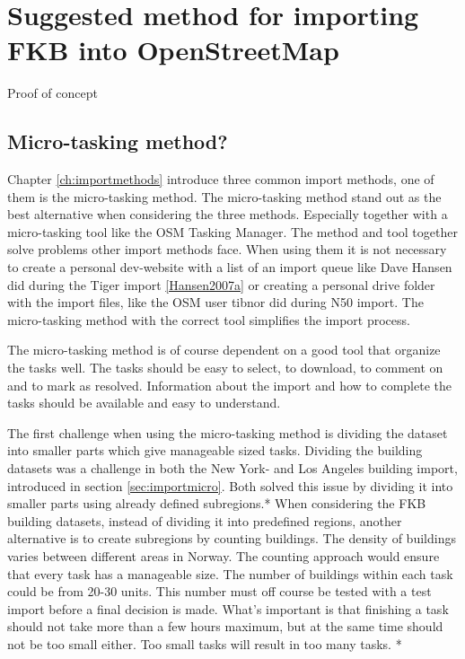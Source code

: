 \chapter{Suggested method for importing FKB into OpenStreetMap}\label{ch:suggmethod}
Proof of concept 

\section{Micro-tasking method?}
Chapter \ref{ch:importmethods} introduce three common import methods, one of them is the micro-tasking method. The micro-tasking method stand out as the best alternative when considering the three methods. Especially together with a micro-tasking tool like the OSM Tasking Manager. The method and tool together solve problems other import methods face. When using them it is not necessary to create a personal dev-website with a list of an import queue like Dave Hansen did during the Tiger import \ref{Hansen2007a} or creating a personal drive folder with the import files, like the OSM user tibnor did during N50 import. The micro-tasking method with the correct tool simplifies the import process.  

The micro-tasking method is of course dependent on a good tool that organize the tasks well. The tasks should be easy to select, to download, to comment on and to mark as resolved. Information about the import and how to complete the tasks should be available and easy to understand. 

The first challenge when using the micro-tasking method is dividing the dataset into smaller parts which give manageable sized tasks. Dividing the building datasets was a challenge in both the New York- and Los Angeles building import, introduced in section \ref{sec:importmicro}. Both solved this issue by dividing it into smaller parts using already defined subregions.*%
 When considering the FKB building datasets, instead of dividing it into predefined regions, another alternative is to create subregions by counting buildings. The density of buildings varies between different areas in Norway. %
 The counting approach would ensure that every task has a manageable size. The number of buildings within each task could be from 20-30 units. This number must off course be tested with a test import before a final decision is made. What's important is that finishing a task should not take more than a few hours maximum, but at the same time should not be too small either. Too small tasks will result in too many tasks. *%
  
